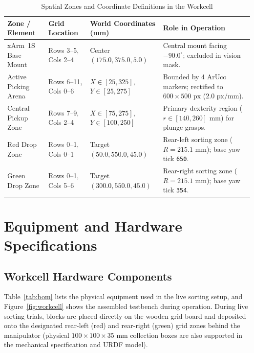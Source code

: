 \documentclass[11pt,a4paper]{article}
\begin{document}
\begin{table}[H]
  \centering
  \small
  \caption{Spatial Zones and Coordinate Definitions in the Workcell}
  \label{tab:zones}
  \begin{tabularx}{\textwidth}{@{}>{\raggedright\arraybackslash}p{3.0cm} >{\raggedright\arraybackslash}p{2.6cm} >{\raggedright\arraybackslash}p{3.6cm} X@{}}
    \toprule
    \textbf{Zone / Element} & \textbf{Grid Location} & \textbf{World Coordinates (mm)} & \textbf{Role in Operation} \\
    \midrule
    xArm~1S Base Mount & Rows 3--5, Cols 2--4 & Center $(175.0, 375.0, 5.0)$ & Central mount facing $-90.0^\circ$; excluded in vision mask. \\
    Active Picking Arena & Rows 6--11, Cols 0--6 & $X \in [25, 325]$, $Y \in [25, 275]$ & Bounded by 4 ArUco markers; rectified to $600 \times 500\text{ px}$ ($2.0\text{ px/mm}$). \\
    Central Pickup Zone & Rows 7--9, Cols 2--4 & $X \in [75, 275]$, $Y \in [100, 250]$ & Primary dexterity region ($r \in [140, 260]\text{ mm}$) for plunge grasps. \\
    Red Drop Zone & Rows 0--1, Cols 0--1 & Target $(50.0, 550.0, 45.0)$ & Rear-left sorting zone ($R = 215.1\text{ mm}$); base yaw tick \texttt{650}. \\
    Green Drop Zone & Rows 0--1, Cols 5--6 & Target $(300.0, 550.0, 45.0)$ & Rear-right sorting zone ($R = 215.1\text{ mm}$); base yaw tick \texttt{354}. \\
    \bottomrule
  \end{tabularx}
\end{table}

\section{Equipment and Hardware Specifications}

\subsection{Workcell Hardware Components}
Table~\ref{tab:bom} lists the physical equipment used in the live sorting setup, and Figure~\ref{fig:workcell} shows the assembled testbench during operation. During live sorting trials, blocks are placed directly on the wooden grid board and deposited onto the designated rear-left (red) and rear-right (green) grid zones behind the manipulator (physical $100\times 100\times 35\text{ mm}$ collection boxes are also supported in the mechanical specification and URDF model).
\end{document}
